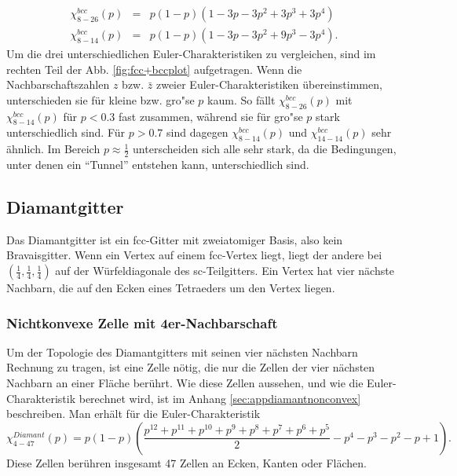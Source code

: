 \begin{eqnarray}
  \chi_{8-26}^{bcc}(p)&=&p(1-p)(1-3p-3p^2+3p^3+3p^4)\\
  \chi_{8-14}^{bcc}(p)&=&p(1-p)(1-3p-3p^2+9p^3-3p^4).
\end{eqnarray}
Um die drei unterschiedlichen Euler-Charakteristiken zu vergleichen, sind im rechten Teil der Abb. \ref{fig:fcc+bccplot} aufgetragen. Wenn die Nachbarschaftszahlen $z$ bzw. $\bar{z}$ zweier Euler-Charak\-ter\-istiken \"ubereinstimmen, unterschieden sie f\"ur kleine bzw. gro"se $p$ kaum. So f\"allt $\chi_{8-26}^{bcc}(p)$ mit $\chi_{8-14}^{bcc}(p)$ f\"ur $p<0.3$ fast zusammen, w\"ahrend sie f\"ur gro"se $p$ stark unterschiedlich sind. F\"ur $p>0.7$ sind dagegen $\chi_{8-14}^{bcc}(p)$ und $\chi_{14-14}^{bcc}(p)$ sehr \"ahnlich. Im Bereich $p\approx \frac{1}{2}$ unterscheiden sich alle sehr stark, da die Bedingungen, unter denen ein ``Tunnel'' entstehen kann, unterschiedlich sind.

\subsection{Diamantgitter}
Das Diamantgitter ist ein fcc-Gitter mit zweiatomiger Basis, also kein Bravaisgitter. Wenn ein Vertex auf einem fcc-Vertex liegt, liegt der andere bei $(\frac{1}{4},\frac{1}{4},\frac{1}{4})$ auf der W\"urfeldiagonale des sc-Teilgitters. Ein Vertex hat vier n\"achste Nachbarn, die auf den Ecken eines Tetraeders um den Vertex liegen.
 
\subsubsection{Nichtkonvexe Zelle mit 4er-Nachbarschaft}
Um der Topologie des Diamantgitters mit seinen vier n\"achsten Nachbarn Rechnung zu tragen, ist eine Zelle n\"otig, die nur die Zellen der vier n\"achsten Nachbarn an einer Fl\"ache ber\"uhrt. Wie diese Zellen aussehen, und wie die Euler-Charakteristik berechnet wird, ist im Anhang \ref{sec:appdiamantnonconvex} beschreiben. Man erh\"alt f\"ur die Euler-Charakteristik 
\begin{equation}                     
        \chi^{Diamant}_{4-47}(p)=p(1-p)\left(\frac{p^{12}+p^{11}+p^{10}+p^9+p^8+p^7+p^6+p^5}{2}-p^4-p^3-p^2-p+1 \right).
\end{equation}
Diese Zellen ber\"uhren insgesamt 47 Zellen an Ecken, Kanten oder Fl\"achen.


